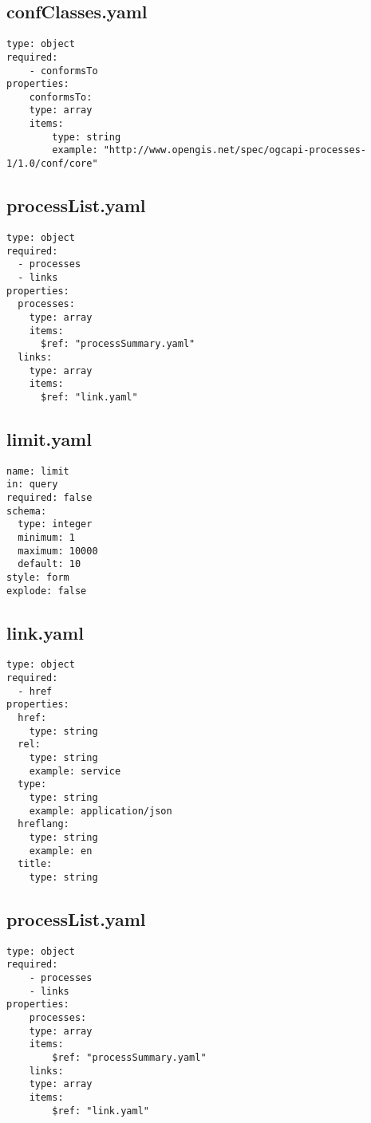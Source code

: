 \subsection{confClasses.yaml}
\begin{lstlisting}[caption={confClasses.yaml}, style = JSON]
type: object
required:
    - conformsTo
properties:
    conformsTo:
    type: array
    items:
        type: string
        example: "http://www.opengis.net/spec/ogcapi-processes-1/1.0/conf/core"
\end{lstlisting}\label{appendixconfClassesyaml}  

\subsection{processList.yaml}
\begin{lstlisting}[caption={processList.yaml}, style = JSON]
type: object
required:
  - processes
  - links
properties:
  processes:
    type: array
    items:
      $ref: "processSummary.yaml"
  links:
    type: array
    items:
      $ref: "link.yaml"
\end{lstlisting}\label{appendixprocessListyaml}  

\subsection{limit.yaml}
\begin{lstlisting}[caption={limit.yaml}, style = JSON]
name: limit
in: query
required: false
schema:
  type: integer
  minimum: 1
  maximum: 10000
  default: 10
style: form
explode: false
\end{lstlisting}\label{appendixlimityaml}  

\subsection{link.yaml}
\begin{lstlisting}[caption={link.yaml}, style = JSON]
type: object
required:
  - href
properties:
  href:
    type: string
  rel:
    type: string
    example: service
  type:
    type: string
    example: application/json
  hreflang:
    type: string
    example: en
  title:
    type: string
\end{lstlisting}\label{appendixlinkyaml}  

\subsection{processList.yaml}
\begin{lstlisting}[caption={processList.yaml}, style = JSON]
type: object
required:
    - processes
    - links
properties:
    processes:
    type: array
    items:
        $ref: "processSummary.yaml"
    links:
    type: array
    items:
        $ref: "link.yaml"
\end{lstlisting}\label{appendixprocessListyaml}  

